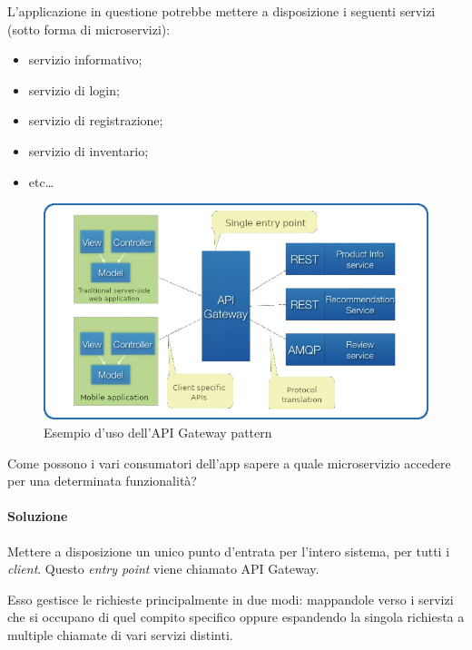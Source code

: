 L'applicazione in questione potrebbe mettere a disposizione i seguenti servizi (sotto forma di microservizi):
\begin{itemize}[noitemsep]
	\item servizio informativo;
	\item servizio di login;
	\item servizio di registrazione;
	\item servizio di inventario;
	\item etc\dots
\end{itemize}


\begin{figure}[H]
	\centering
	\includegraphics[width=\textwidth]{immagini/apigateway.png}
	\caption[API Gateway]{Esempio d'uso dell'API Gateway pattern\footnotemark}
	\label{fig:api-gateway}
\end{figure}

Come possono i vari consumatori dell'app sapere a quale microservizio accedere per una determinata funzionalità?

\paragraph*{Soluzione} Mettere a disposizione un unico punto d'entrata per l'intero sistema, per tutti i \textit{client}.
Questo \textit{entry point} viene chiamato API Gateway.

Esso gestisce le richieste principalmente in due modi:
mappandole verso i servizi che si occupano di quel compito specifico oppure espandendo la singola richiesta a multiple chiamate di vari servizi distinti.

